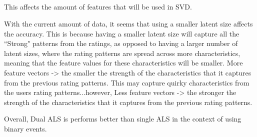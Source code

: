 \subsection{}
This affects the amount of features that will be used in SVD.

With the current amount of data, it seems that using a smaller latent size affects the accuracy. This is because having a smaller latent size will capture all the ``Strong" patterns from the ratings, as opposed to having a larger number of latent sizes, where the rating patterns are spread across more characteristics, meaning that the feature values for these characteristics will be smaller. More feature vectors -> the smaller the strength of the characteristics that it captures from the previous rating patterns. This may capture quirky characteristics from the users rating patterns...however, Less feature vectors -> the stronger the strength of the characteristics that it captures from the previous rating patterns. 

Overall, Dual ALS is performs better than single ALS in the context of using binary events.




